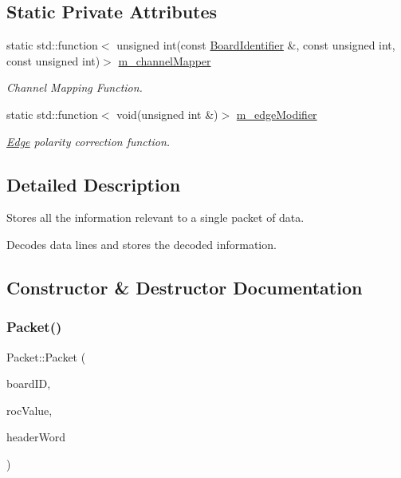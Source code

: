 \subsection*{Static Private Attributes}
\begin{DoxyCompactItemize}
\item 
static std\+::function$<$ unsigned int(const \hyperlink{class_board_identifier}{Board\+Identifier} \&, const unsigned int, const unsigned int)$>$ \hyperlink{class_packet_a33bf104c6d884aabd492de0e4eb5d293}{m\+\_\+channel\+Mapper}
\begin{DoxyCompactList}\small\item\em Channel Mapping Function. \end{DoxyCompactList}\item 
static std\+::function$<$ void(unsigned int \&)$>$ \hyperlink{class_packet_aa95ed5326667f67a5c2d101cd5a4afca}{m\+\_\+edge\+Modifier}
\begin{DoxyCompactList}\small\item\em \hyperlink{class_edge}{Edge} polarity correction function. \end{DoxyCompactList}\end{DoxyCompactItemize}


\subsection{Detailed Description}
Stores all the information relevant to a single packet of data. 

Decodes data lines and stores the decoded information. 

\subsection{Constructor \& Destructor Documentation}
\mbox{\label{class_packet_a36ed85cfdddceb45fbeff46c3514f17e}} 
\subsubsection{\texorpdfstring{Packet()}{Packet()}}
{\footnotesize\ttfamily Packet\+::\+Packet (\begin{DoxyParamCaption}\item[{const \hyperlink{class_board_identifier}{Board\+Identifier} \&}]{board\+ID,  }\item[{const unsigned int}]{roc\+Value,  }\item[{const unsigned int}]{header\+Word }\end{DoxyParamCaption})}



